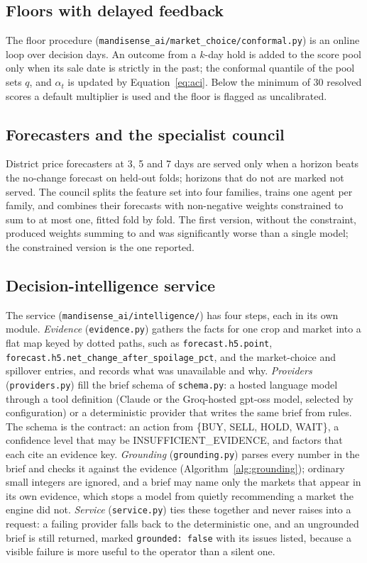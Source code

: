 \subsection{Floors with delayed feedback}

The floor procedure (\texttt{mandisense\_ai/market\_choice/conformal.py}) is an online loop over decision days. An outcome from a $k$-day hold is added to the score pool only when its sale date is strictly in the past; the conformal quantile of the pool sets $q$, and $\alpha_t$ is updated by Equation~\ref{eq:aci}. Below the minimum of 30 resolved scores a default multiplier is used and the floor is flagged as uncalibrated.

\subsection{Forecasters and the specialist council}

District price forecasters at 3, 5 and 7 days are served only when a horizon beats the no-change forecast on held-out folds; horizons that do not are marked not served. The council splits the feature set into four families, trains one agent per family, and combines their forecasts with non-negative weights constrained to sum to at most one, fitted fold by fold. The first version, without the constraint, produced weights summing to \CouncilUnconstrainedSum{} and was significantly worse than a single model; the constrained version is the one reported.

\subsection{Decision-intelligence service}

The service (\texttt{mandisense\_ai/intelligence/}) has four steps, each in its own module. \emph{Evidence} (\texttt{evidence.py}) gathers the facts for one crop and market into a flat map keyed by dotted paths, such as \texttt{forecast.h5.point}, \texttt{forecast.h5.net\_change\_after\_spoilage\_pct}, and the market-choice and spillover entries, and records what was unavailable and why. \emph{Providers} (\texttt{providers.py}) fill the brief schema of \texttt{schema.py}: a hosted language model through a tool definition (Claude or the Groq-hosted gpt-oss model, selected by configuration) or a deterministic provider that writes the same brief from rules. The schema is the contract: an action from \{BUY, SELL, HOLD, WAIT\}, a confidence level that may be INSUFFICIENT\_EVIDENCE, and factors that each cite an evidence key. \emph{Grounding} (\texttt{grounding.py}) parses every number in the brief and checks it against the evidence (Algorithm~\ref{alg:grounding}); ordinary small integers are ignored, and a brief may name only the markets that appear in its own evidence, which stops a model from quietly recommending a market the engine did not. \emph{Service} (\texttt{service.py}) ties these together and never raises into a request: a failing provider falls back to the deterministic one, and an ungrounded brief is still returned, marked \texttt{grounded: false} with its issues listed, because a visible failure is more useful to the operator than a silent one.

